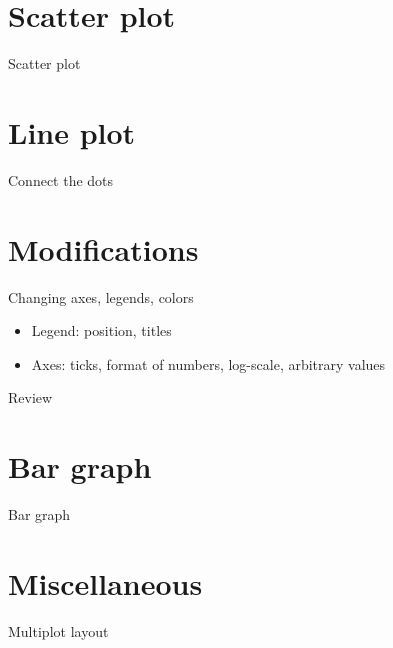 \documentclass{beamer}
\begin{document}
\section{Scatter plot}
\begin{frame}{Scatter plot}
\end{frame}

\section{Line plot}
\begin{frame}{Connect the dots}
\end{frame}

\section{Modifications}
\begin{frame}{Changing axes, legends, colors}
\begin{itemize}
\item Legend: position, titles
\item Axes: ticks, format of numbers, log-scale, arbitrary values
\end{itemize}
\end{frame}

\begin{frame}{Review}
\end{frame}

\section{Bar graph}
\begin{frame}{Bar graph}
\end{frame}

\section{Miscellaneous}
\begin{frame}{Multiplot layout}
\end{frame}
\end{document}
